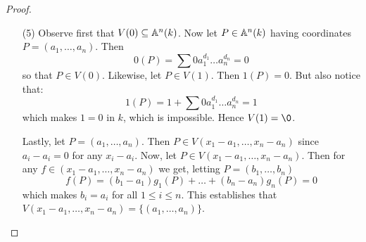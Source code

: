 \begin{proof}
\begin{enumerate}
    \item[(5)] Observe first that $V(0) \subseteq \mathbb{A}^n(k)$. Now let $P
      \in \mathbb{A}^n(k)$ having coordinates $P=(a_1, \dots, a_n)$. Then
      \begin{equation*}
        0(P)=\sum{0a_1^{d_1} \dots a_n^{d_n}}=0
      \end{equation*}
      so that $P \in V(0)$. Likewise, let $P \in V(1)$. Then $1(P)=0$.
      But also notice that:
      \begin{equation*}
        1(P)=1+\sum{0a_1^{d_1} \dots a_n^{d_n}}=1
      \end{equation*}
      which makes $1=0$ in $k$, which is impossible. Hence
      $V(1)=\0$.

      Lastly, let $P=(a_1, \dots, a_n)$. Then $P \in V(x_1-a_1, \dots,
      x_n-a_n)$ since $a_i-a_i=0$ for any $x_i-a_i$. Now, let $P \in
      V(x_1-a_1, \dots, x_n-a_n)$. Then for any $f \in (x_1-a_1,
      \dots, x_n-a_n)$ we get, letting $P=(b_1, \dots, b_n)$
      \begin{equation*}
        f(P)=(b_1-a_1)g_1(P)+\dots+(b_n-a_n)g_n(P)=0
      \end{equation*}
      which makes $b_i=a_i$ for all $1 \leq i \leq n$. This
      establishes that $V(x_1-a_1, \dots, x_n-a_n)=\{(a_1, \dots,
      a_n)\}$.
  \end{enumerate}
\end{proof}

